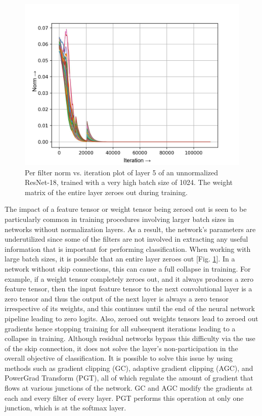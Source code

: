 \documentclass[times,sort&compress]{elsarticle}
\begin{document}
\begin{figure}[t]
\centering
\includegraphics[width=0.45\columnwidth]{baseline_high_bs-w-layer2-2}
\caption{ Per filter norm vs. iteration plot of layer 5 of an unnormalized ResNet-18,
trained with a very high batch size of 1024. The weight matrix of the entire layer
zeroes out during training. }
\label{fig:high_bs}
\end{figure}





The impact of a feature tensor or weight tensor being zeroed out is seen to be
particularly common in training procedures involving larger batch sizes in networks
without normalization layers. As a result, the network's parameters are underutilized
since some of the filters are not involved in extracting any useful information that is
important for performing classification. When working with large batch sizes, it is
possible that an entire layer zeroes out [Fig. \ref{fig:high_bs}]. In a network without
skip connections, this can cause a full collapse in training. For example, if a weight
tensor completely zeroes out, and it always produces a zero feature tensor, then the
input feature tensor to the next convolutional layer is a zero tensor and thus the
output of the next layer is always a zero tensor irrespective of its weights, and this
continues until the end of the neural network pipeline leading to zero logits. Also,
zeroed out weights tensors lead to zeroed out gradients hence stopping training for all
subsequent iterations leading to a collapse in training. Although residual networks
bypass this difficulty via the use of the skip connection, it does not solve the layer's
non-participation in the overall objective of classification. It is possible to solve
this issue by using methods such as gradient clipping (GC), adaptive gradient clipping
(AGC), and PowerGrad Transform (PGT), all of which regulate the amount of gradient that
flows at various junctions of the network. GC and AGC modify the gradients at each and
every filter of every layer. PGT performs this operation at only one junction, which is
at the softmax layer.
\end{document}
